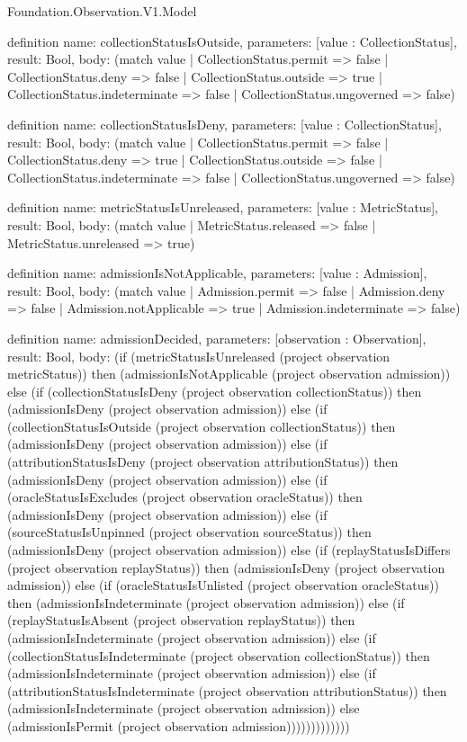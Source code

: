 \begin{lexlean}{Foundation.Observation.V1.Model}
\begin{semanticmodule}
definition{
  name: collectionStatusIsOutside,
  parameters: [value : CollectionStatus],
  result: Bool,
  body: (match value
    | CollectionStatus.permit => false
    | CollectionStatus.deny => false
    | CollectionStatus.outside => true
    | CollectionStatus.indeterminate => false
    | CollectionStatus.ungoverned => false)
}

definition{
  name: collectionStatusIsDeny,
  parameters: [value : CollectionStatus],
  result: Bool,
  body: (match value
    | CollectionStatus.permit => false
    | CollectionStatus.deny => true
    | CollectionStatus.outside => false
    | CollectionStatus.indeterminate => false
    | CollectionStatus.ungoverned => false)
}

definition{
  name: metricStatusIsUnreleased,
  parameters: [value : MetricStatus],
  result: Bool,
  body: (match value | MetricStatus.released => false | MetricStatus.unreleased => true)
}

definition{
  name: admissionIsNotApplicable,
  parameters: [value : Admission],
  result: Bool,
  body: (match value
    | Admission.permit => false
    | Admission.deny => false
    | Admission.notApplicable => true
    | Admission.indeterminate => false)
}

definition{
  name: admissionDecided,
  parameters: [observation : Observation],
  result: Bool,
  body: (if (metricStatusIsUnreleased (project observation metricStatus)) then (admissionIsNotApplicable (project observation admission)) else (if (collectionStatusIsDeny (project observation collectionStatus)) then (admissionIsDeny (project observation admission)) else (if (collectionStatusIsOutside (project observation collectionStatus)) then (admissionIsDeny (project observation admission)) else (if (attributionStatusIsDeny (project observation attributionStatus)) then (admissionIsDeny (project observation admission)) else (if (oracleStatusIsExcludes (project observation oracleStatus)) then (admissionIsDeny (project observation admission)) else (if (sourceStatusIsUnpinned (project observation sourceStatus)) then (admissionIsDeny (project observation admission)) else (if (replayStatusIsDiffers (project observation replayStatus)) then (admissionIsDeny (project observation admission)) else (if (oracleStatusIsUnlisted (project observation oracleStatus)) then (admissionIsIndeterminate (project observation admission)) else (if (replayStatusIsAbsent (project observation replayStatus)) then (admissionIsIndeterminate (project observation admission)) else (if (collectionStatusIsIndeterminate (project observation collectionStatus)) then (admissionIsIndeterminate (project observation admission)) else (if (attributionStatusIsIndeterminate (project observation attributionStatus)) then (admissionIsIndeterminate (project observation admission)) else (admissionIsPermit (project observation admission)))))))))))))
}


\end{semanticmodule}
\end{lexlean}
